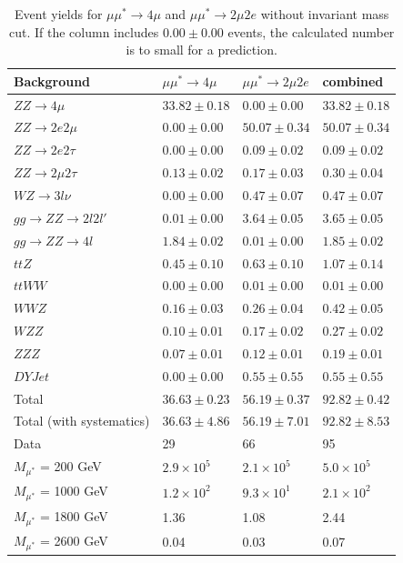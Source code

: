 \begin{table}[h!]
\begin{center}
\begin{tabular}{|l|l|l|l|}
\hline 
Background & $\mu\mu^{*}\rightarrow 4\mu$ & $\mu\mu^{*}\rightarrow 2\mu 2e$ & combined \\ 
\hline
$ZZ \rightarrow 4\mu$ & $33.82\pm 0.18$ & $0.00\pm 0.00$ & $33.82\pm 0.18$ \\
$ZZ \rightarrow 2e 2\mu$ & $0.00\pm 0.00$ & $50.07\pm 0.34$ & $50.07\pm 0.34$ \\
$ZZ \rightarrow 2e 2\tau$ & $0.00\pm 0.00$ & $0.09\pm 0.02$ & $0.09\pm 0.02$\\
$ZZ \rightarrow 2\mu 2\tau$ & $0.13\pm 0.02$ & $0.17\pm 0.03$ & $0.30\pm 0.04$\\
$WZ \rightarrow 3l \nu$ & $0.00\pm 0.00$ & $0.47\pm 0.07$ & $0.47\pm 0.07$\\
$gg \rightarrow ZZ \rightarrow 2l2l'$ & $0.01\pm 0.00$ & $3.64\pm 0.05$ & $3.65\pm 0.05$\\
$gg \rightarrow ZZ \rightarrow 4l$ & $1.84\pm 0.02$ & $0.01\pm 0.00$ & $1.85\pm 0.02$\\
$ttZ$ & $0.45\pm 0.10$ & $0.63\pm 0.10$ & $1.07\pm 0.14$\\
$ttWW$ & $0.00\pm 0.00$ & $0.01\pm 0.00$ & $0.01\pm 0.00$\\
$WWZ$ & $0.16\pm 0.03$ & $0.26\pm 0.04$ & $0.42\pm 0.05$\\
$WZZ$ & $0.10\pm 0.01$ & $0.17\pm 0.02$ & $0.27\pm 0.02$\\
$ZZZ$ & $0.07\pm 0.01$ & $0.12\pm 0.01$ & $0.19\pm 0.01$\\
$DYJet$ & $0.00\pm 0.00$ & $0.55\pm 0.55$ & $0.55\pm 0.55$\\
\hline
Total & $36.63\pm 0.23$ & $56.19\pm 0.37$ & $92.82\pm 0.42$\\
Total (with systematics) & $36.63\pm 4.86$ & $56.19\pm 7.01$ & $92.82\pm 8.53$\\
\hline
\hline
Data & 29 & 66 & 95\\
\hline
\hline
$M_{\mu^{*}}$ = 200 GeV & $2.9 \times 10^{5}$  & $2.1 \times 10^{5}$ & $5.0 \times 10^{5}$\\
$M_{\mu^{*}}$ = 1000 GeV & $1.2 \times 10^{2}$ & $9.3 \times 10^{1}$ & $2.1 \times 10^{2}$\\
$M_{\mu^{*}}$ = 1800 GeV & 1.36 & 1.08 & 2.44\\
$M_{\mu^{*}}$ = 2600 GeV & 0.04 & 0.03 & 0.07\\
\hline
\end{tabular}
\end{center}
\caption{\label{tab:yieldsmustar}Event yields for $\mu\mu^{*}\rightarrow 4\mu$ and $\mu\mu^{*}\rightarrow 2\mu 2e$ without invariant mass cut. If the column includes $0.00 \pm 0.00$ events, the calculated number is to small for a prediction.}
\end{table}


